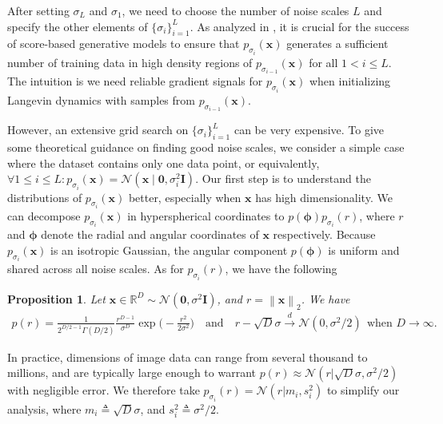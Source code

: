 \documentclass{article}
\newcommand{\mbb}[1]{\mathbb{#1}}
\newcommand{\mcal}{\mathcal}
\newcommand{\norm}[1]{\left\lVert#1\right\rVert}
\newtheorem{proposition}{Proposition}
\newcommand{\bfx}{\mathbf{x}}
\newcommand{\bfI}{\mathbf{I}}
\newcommand{\bfzero}{\mathbf{0}}
\newcommand{\bfphi}{{\boldsymbol{\phi}}}
\begin{document}
After setting $\sigma_L$ and $\sigma_1$, we need to choose the number of noise scales $L$ and specify the other elements of $\{\sigma_i\}_{i=1}^L$. As analyzed in \cite{song2019generative}, it is crucial for the success of score-based generative models to ensure that $p_{\sigma_i}(\bfx)$ generates a sufficient number of training data in high density regions of $p_{\sigma_{i-1}}(\bfx)$ for all $1 < i \leq L$. The intuition is we need reliable gradient signals for $p_{\sigma_i}(\bfx)$ when initializing Langevin dynamics with samples from $p_{\sigma_{i-1}}(\bfx)$. 

However, an extensive grid search on $\{\sigma_i\}_{i=1}^L$ can be very expensive. To give some theoretical guidance on finding good noise scales, we consider a simple case where the dataset contains only one data point, or equivalently, $\forall 1\leq i \leq L: p_{\sigma_i}(\bfx) = \mcal{N}(\bfx\mid \bfzero, \sigma_i^2 \bfI)$. Our first step is to understand the distributions of $p_{\sigma_i}(\bfx)$ better, especially when $\bfx$ has high dimensionality. We can decompose $p_{\sigma_i}(\bfx)$ in hyperspherical coordinates to $p(\bfphi)p_{\sigma_i}(r)$, where $r$ and $\bfphi$ denote the radial and angular coordinates of $\bfx$ respectively. Because $p_{\sigma_i}(\bfx)$ is an isotropic Gaussian, the angular component $p(\bfphi)$ is uniform and shared across all noise scales. As for $p_{\sigma_i}(r)$, we have the following
\begin{proposition}\label{prop:noise_levels}
Let $\bfx \in \mbb{R}^D \sim \mcal{N}(\bfzero, \sigma^2 \bfI)$, and $r = \norm{\bfx}_2$. We have
\begin{align*}
    p(r) = \frac{1}{2^{D/2 - 1}\Gamma(D/2)} \frac{r^{D-1}}{\sigma^{D}} \exp \bigg(-\frac{r^2}{2\sigma^2} \bigg)\quad \text{and} \quad
    r - \sqrt{D}\sigma \stackrel{d}{\to} \mcal{N}(0, \sigma^2 / 2) ~~\text{when $D \to \infty$}.
\end{align*}
\end{proposition}
In practice, dimensions of image data can range from several thousand to millions, and are typically large enough to warrant $p(r) \approx \mcal{N}(r| \sqrt{D} \sigma, \sigma^2 / 2)$ with negligible error. We therefore take $p_{\sigma_i}(r) = \mcal{N}(r | m_i, s_i^2)$ to simplify our analysis, where $m_i \triangleq \sqrt{D}\sigma$, and $s_i^2 \triangleq \sigma^2 / 2$.
\end{document}
